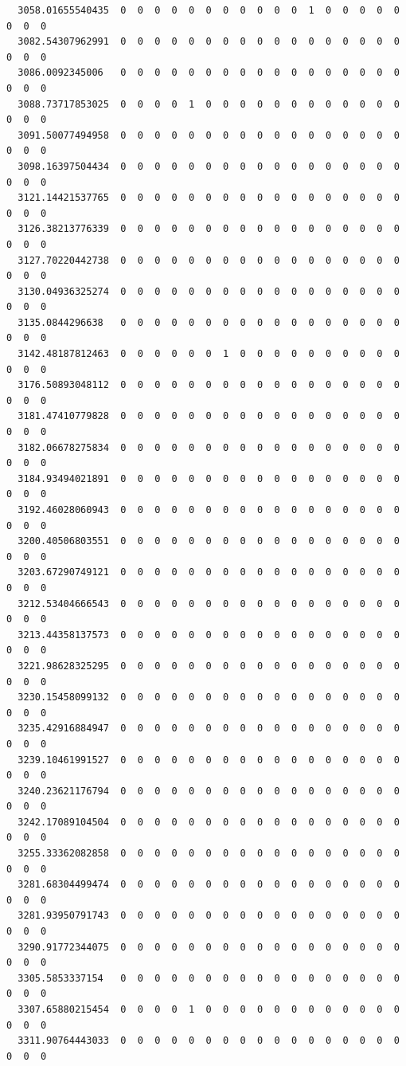 \documentclass[
  letterpaper,
  DIV=11,
  numbers=noendperiod]{scrartcl}
\begin{document}
\begin{verbatim}
  3058.01655540435  0  0  0  0  0  0  0  0  0  0  0  1  0  0  0  0  0  0  0  0
  3082.54307962991  0  0  0  0  0  0  0  0  0  0  0  0  0  0  0  0  0  0  0  0
  3086.0092345006   0  0  0  0  0  0  0  0  0  0  0  0  0  0  0  0  0  0  0  0
  3088.73717853025  0  0  0  0  1  0  0  0  0  0  0  0  0  0  0  0  0  0  0  0
  3091.50077494958  0  0  0  0  0  0  0  0  0  0  0  0  0  0  0  0  0  0  0  0
  3098.16397504434  0  0  0  0  0  0  0  0  0  0  0  0  0  0  0  0  0  0  0  0
  3121.14421537765  0  0  0  0  0  0  0  0  0  0  0  0  0  0  0  0  0  0  0  0
  3126.38213776339  0  0  0  0  0  0  0  0  0  0  0  0  0  0  0  0  0  0  0  0
  3127.70220442738  0  0  0  0  0  0  0  0  0  0  0  0  0  0  0  0  0  0  0  0
  3130.04936325274  0  0  0  0  0  0  0  0  0  0  0  0  0  0  0  0  0  0  0  0
  3135.0844296638   0  0  0  0  0  0  0  0  0  0  0  0  0  0  0  0  0  0  0  0
  3142.48187812463  0  0  0  0  0  0  1  0  0  0  0  0  0  0  0  0  0  0  0  0
  3176.50893048112  0  0  0  0  0  0  0  0  0  0  0  0  0  0  0  0  0  0  0  0
  3181.47410779828  0  0  0  0  0  0  0  0  0  0  0  0  0  0  0  0  0  0  0  0
  3182.06678275834  0  0  0  0  0  0  0  0  0  0  0  0  0  0  0  0  0  0  0  0
  3184.93494021891  0  0  0  0  0  0  0  0  0  0  0  0  0  0  0  0  0  0  0  0
  3192.46028060943  0  0  0  0  0  0  0  0  0  0  0  0  0  0  0  0  0  0  0  0
  3200.40506803551  0  0  0  0  0  0  0  0  0  0  0  0  0  0  0  0  0  0  0  0
  3203.67290749121  0  0  0  0  0  0  0  0  0  0  0  0  0  0  0  0  0  0  0  0
  3212.53404666543  0  0  0  0  0  0  0  0  0  0  0  0  0  0  0  0  0  0  0  0
  3213.44358137573  0  0  0  0  0  0  0  0  0  0  0  0  0  0  0  0  0  0  0  0
  3221.98628325295  0  0  0  0  0  0  0  0  0  0  0  0  0  0  0  0  0  0  0  0
  3230.15458099132  0  0  0  0  0  0  0  0  0  0  0  0  0  0  0  0  0  0  0  0
  3235.42916884947  0  0  0  0  0  0  0  0  0  0  0  0  0  0  0  0  0  0  0  0
  3239.10461991527  0  0  0  0  0  0  0  0  0  0  0  0  0  0  0  0  0  0  0  0
  3240.23621176794  0  0  0  0  0  0  0  0  0  0  0  0  0  0  0  0  0  0  0  0
  3242.17089104504  0  0  0  0  0  0  0  0  0  0  0  0  0  0  0  0  0  0  0  0
  3255.33362082858  0  0  0  0  0  0  0  0  0  0  0  0  0  0  0  0  0  0  0  0
  3281.68304499474  0  0  0  0  0  0  0  0  0  0  0  0  0  0  0  0  0  0  0  0
  3281.93950791743  0  0  0  0  0  0  0  0  0  0  0  0  0  0  0  0  0  0  0  0
  3290.91772344075  0  0  0  0  0  0  0  0  0  0  0  0  0  0  0  0  0  0  0  0
  3305.5853337154   0  0  0  0  0  0  0  0  0  0  0  0  0  0  0  0  0  0  0  0
  3307.65880215454  0  0  0  0  1  0  0  0  0  0  0  0  0  0  0  0  0  0  0  0
  3311.90764443033  0  0  0  0  0  0  0  0  0  0  0  0  0  0  0  0  0  0  0  0
                  

\end{verbatim}
\end{document}
